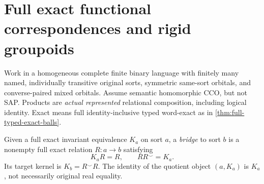 \section{Full exact functional correspondences and rigid groupoids}
\label{sec:foundational-rigid-groupoid}

Work in a homogeneous complete finite binary language with finitely
many named, individually transitive original sorts, symmetric
same-sort orbitals, and converse-paired mixed orbitals. Assume
semantic homomorphic CCO, but not SAP. Products are \emph{actual
represented} relational composition, including logical identity.
Exact means full identity-inclusive typed word-exact as in
\cref{thm:full-typed-exact-balls}.

\begin{definition}
\label{def:foundational-exact-bridge}
Given a full exact invariant equivalence $K_a$ on sort $a$,
a \emph{bridge} to sort $b$ is a nonempty full exact relation
$R:a\to b$ satisfying
\[
 K_aR=R,\qquad RR^\smile=K_a.
 \tag{FB}\label{eq:exact-bridge}
\]
Its target kernel is $K_b=R^\smile R$.
The identity of the quotient object $(a,K_a)$ is $K_a$,
not necessarily original real equality.
\end{definition}

